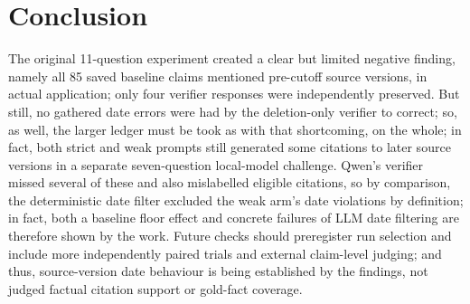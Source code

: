 \documentclass[12pt,a4paper]{article}
\begin{document}
\section{Conclusion}
The original 11-question experiment created a clear but limited negative finding, namely all 85 saved baseline claims mentioned pre-cutoff source versions, in actual application; only four verifier responses were independently preserved. But still, no gathered date errors were had by the deletion-only verifier to correct; so, as well, the larger ledger must be took as with that shortcoming, on the whole; in fact, both strict and weak prompts still generated some citations to later source versions in a separate seven-question local-model challenge. Qwen's verifier missed several of these and also mislabelled eligible citations, so by comparison, the deterministic date filter excluded the weak arm's date violations by definition; in fact, both a baseline floor effect and concrete failures of LLM date filtering are therefore shown by the work. Future checks should preregister run selection and include more independently paired trials and external claim-level judging; and thus, source-version date behaviour is being established by the findings, not judged factual citation support or gold-fact coverage.

\printbibliography
\end{document}
